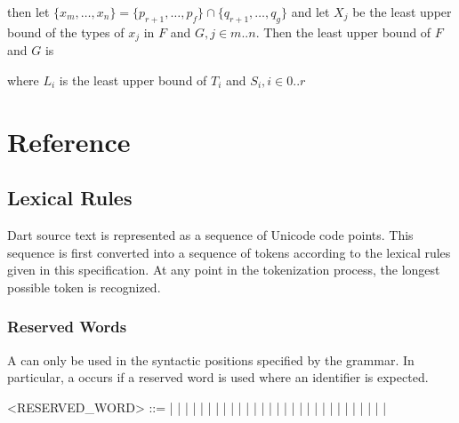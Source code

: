 \documentclass[makeidx]{article}
\begin{document}
{\begin{itemize}
then let
$\{x_m, \ldots, x_n\} = \{p_{r+1}, \ldots, p_f\} \cap \{q_{r+1}, \ldots, q_g\}$
and let $X_j$ be the least upper bound of the types of $x_j$ in $F$ and
$G, j \in m .. n$.
Then the least upper bound of $F$ and $G$ is

\noindent
{}

where $L_i$ is the least upper bound of $T_i$ and $S_i, i \in 0 .. r$
\end{itemize}



\section{Reference}


\subsection{Lexical Rules}

\LMHash{}%
Dart source text is represented as a sequence of Unicode code points.
This sequence is first converted into a sequence of tokens
according to the lexical rules given in this specification.
At any point in the tokenization process,
the longest possible token is recognized.


\subsubsection{Reserved Words}

\LMHash{}%
A  can only be used in the syntactic positions
specified by the grammar.
In particular, a  occurs if a reserved word is used
where an identifier is expected.


\begin{grammar}
<RESERVED\_WORD> ::= \ASSERT{} | \BREAK{} | \CASE{} | \CATCH{} |
    \CLASS{} | \CONST{}
  \alt\hspace{-3mm} \CONTINUE{} | \DEFAULT{} | \DO{} | \ELSE{} | \ENUM{} |
    \EXTENDS{} | \FALSE{} | \FINAL{} | \FINALLY{} | \FOR{}
  \alt\hspace{-3mm} \IF{} | \IN{} | \IS{} | \NEW{} | \NULL{} | \RETHROW{} |
    \RETURN{} | \SUPER{} | \SWITCH{} | \THIS{} | \THROW{}
  \alt\hspace{-3mm} \TRUE{} | \TRY{} | \VAR{} | \VOID{} | \WHILE{} | \WITH{}
\end{grammar}

}
\end{document}
